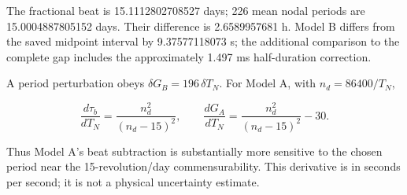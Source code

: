 \documentclass[10pt,a4paper]{article}
\numberwithin{equation}{section}
\begin{document}
\begin{sloppypar}The fractional beat is 15.1112802708527 days; 226 mean nodal periods are 15.0004887805152 days. Their difference is 2.6589957681 h. Model B differs from the saved midpoint interval by 9.37577118073 s; the additional comparison to the complete gap includes the approximately 1.497 ms half-duration correction.\end{sloppypar}


\begin{sloppypar}A period perturbation obeys \(\delta G_B=196\,\delta T_N\). For Model A, with \(n_d=86400/T_N\),\end{sloppypar}


\begin{equation}\frac{d\tau_b}{dT_N}=
\frac{n_d^2}{(n_d-15)^2},\qquad
\frac{dG_A}{dT_N}=
\frac{n_d^2}{(n_d-15)^2}-30.\label{eq:ch5-13}\end{equation}

\begin{sloppypar}Thus Model A's beat subtraction is substantially more sensitive to the chosen period near the 15-revolution/day commensurability. This derivative is in seconds per second; it is not a physical uncertainty estimate.\end{sloppypar}
\end{document}
